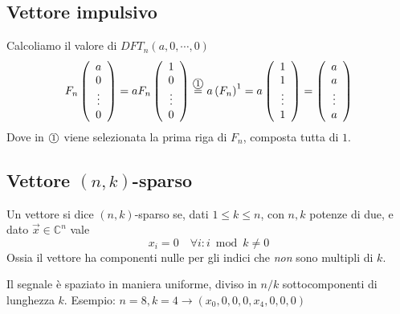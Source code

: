 \subsection{Vettore impulsivo}
\label{sss:vetimp}
Calcoliamo il valore di $DFT_n \left( a, 0, \cdots, 0 \right)$
\begin{equation*}
    F_n
    \left( 
        \begin{array}[h]{c}
            a \\ 0 \\ \vdots \\ 0
        \end{array}
    \right)
    =
    a F_n
    \left( 
        \begin{array}[h]{c}
            1 \\ 0 \\ \vdots \\ 0
        \end{array}
    \right)
    \overset{\circola{1}}{=}
    a \left( F_n \right)^1
    =
    a
    \left( 
        \begin{array}[h]{c}
            1 \\ 1 \\ \vdots \\ 1
        \end{array}
    \right)
    =
    \left( 
        \begin{array}[h]{c}
            a \\ a \\ \vdots \\ a
        \end{array}
    \right)
\end{equation*}
Dove in $\mbox{\textcircled{\footnotesize 1}}$ viene selezionata la prima riga di $F_n$, composta tutta di $1$.

\subsection{Vettore $(n,k)$-sparso}
\begin{definition}
    Un vettore si dice $(n,k)$-sparso se, dati $1 \leq k \leq n$, con $n,k$ potenze di due, e dato $\vec{x} \in \mathbb{C}^n$ vale
    \begin{equation*}
        x_i = 0 \quad \forall i : i \bmod k \neq 0
    \end{equation*}
    Ossia il vettore ha componenti nulle per gli indici che \emph{non} sono multipli di $k$.
    \label{def:nksparso}
\end{definition}
Il segnale è spaziato in maniera uniforme, diviso in $n/k$ sottocomponenti di lunghezza $k$.
Esempio: $n=8, k=4 \rightarrow \left( x_0,0,0,0,x_4,0,0,0 \right)$

